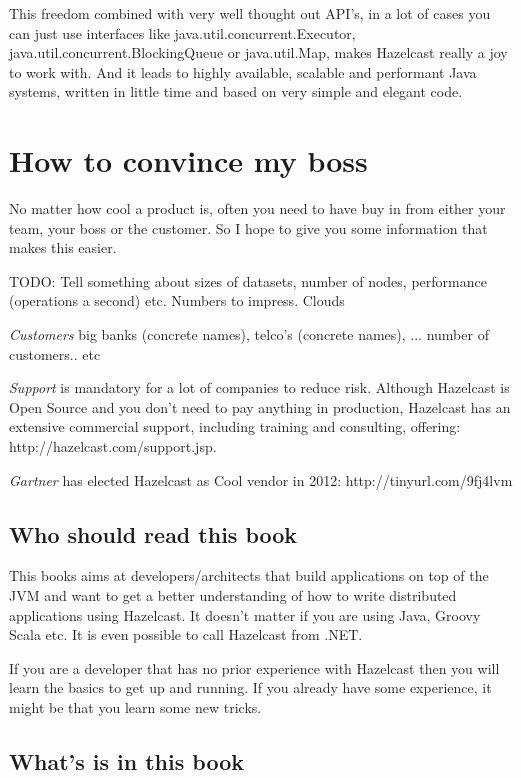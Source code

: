This freedom combined with very well thought out API's, in a lot of cases you can just use interfaces like java.util.concurrent.Executor, java.util.concurrent.BlockingQueue or java.util.Map, makes Hazelcast really a joy to work with. And it leads to highly available, scalable and performant Java systems, written in little time and based on very simple and elegant code.

\section{How to convince my boss}
No matter how cool a product is, often you need to have buy in from either your team, your boss or the customer. So I hope to give you some information that makes this easier.

TODO: Tell something about sizes of datasets, number of nodes, performance (operations a second) etc. Numbers to impress. Clouds

\emph{Customers} big banks (concrete names), telco's (concrete names), ... number of customers.. etc

\emph{Support} is mandatory for a lot of companies to reduce risk. Although Hazelcast is Open Source and you don't need to pay anything in production, Hazelcast has an extensive commercial support, including training and consulting,  offering: http://hazelcast.com/support.jsp. 

\emph{Gartner} has elected Hazelcast as Cool vendor in 2012: http://tinyurl.com/9fj4lvm

\subsection*{Who should read this book}
This books aims at developers/architects that build applications on top of the JVM and want to get a better understanding of how to write distributed applications using Hazelcast. It doesn't matter if you are using Java, Groovy Scala etc. It is even possible to call Hazelcast from .NET.

If you are a developer that has no prior experience with Hazelcast then you will learn the basics to get up and running. If you already have some experience, it might be that you learn some new tricks.

\subsection*{What's is in this book}

